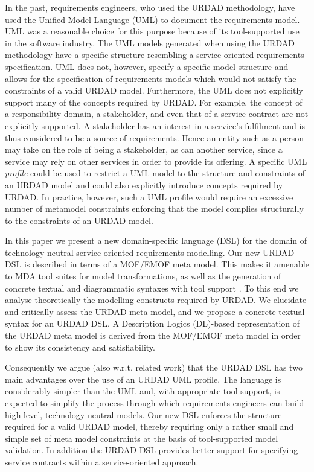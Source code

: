 In the past, requirements engineers, who used the URDAD methodology, have used the Unified Model Language (UML) to document the requirements model. UML was a reasonable choice for this purpose because of its tool-supported use in the software industry.  The UML models generated when using the URDAD methodology have a specific structure resembling a service-oriented requirements specification. UML does not, however, specify a specific model structure and allows for the specification of requirements models which would not satisfy the constraints of a valid URDAD model. Furthermore, the UML does not explicitly support many of the concepts required by URDAD. For example, the concept of a responsibility domain, a stakeholder, and even that of a service contract are not explicitly supported. A stakeholder has an interest in a service's fulfilment and is thus considered to be a source of requirements. Hence an entity such as a person may take on the role of being a stakeholder, as can another service, since a service may rely on other services in order to provide its offering. A specific UML \emph{profile} could be used to restrict a UML model to the structure and constraints of an URDAD model and could also explicitly introduce concepts required by URDAD. In practice, however, such a UML profile would require an excessive number of metamodel constraints enforcing that the model complies structurally to the constraints of an URDAD model.

In this paper we present a new domain-specific language (DSL) for the domain of technology-neutral service-orien\-ted requirements modelling. Our new URDAD DSL is described in terms of a MOF/EMOF meta model. This makes it amenable to MDA tool suites for model transformations, as well as the generation of concrete textual and diagrammatic syntaxes with tool support \cite{gronback_model_2008}. To this end we analyse theoretically the modelling constructs required by URDAD. We elucidate and critically assess the URDAD meta model, and we propose a concrete textual syntax for an URDAD DSL. A Description Logics (DL)-based representation of the URDAD meta model is derived from the MOF/EMOF meta model in order to show its consistency and satisfiability.

Consequently we argue (also w.r.t. related work) that the URDAD DSL has two main advantages over the use of an URDAD UML profile. The language is considerably simpler than the UML and, with appropriate tool support, is expected to simplify the process through which requirements engineers can build high-level, technology-neutral models. Our new DSL enforces the structure required for a valid URDAD model, thereby requiring only a rather small and simple set of meta model constraints at the basis of tool-supported model validation. In addition the URDAD DSL provides better support for specifying service contracts within a service-oriented approach.

